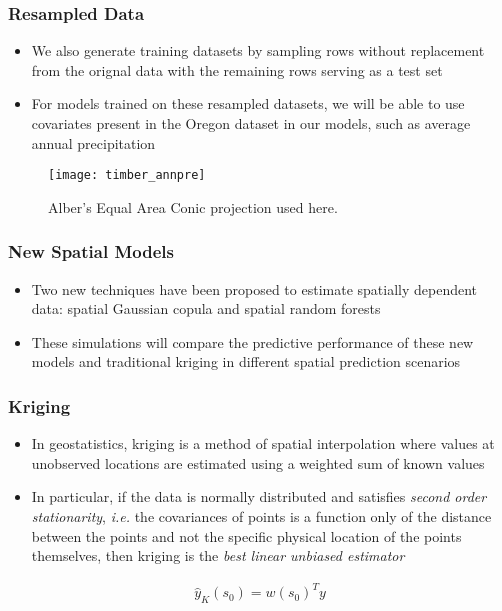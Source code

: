 \documentclass{beamer}
\begin{document}
\begin{frame}
	\frametitle{Resampled Data}
	\begin{itemize}
		\item We also generate training datasets by sampling rows without replacement from the orignal data with the remaining rows serving as a test set
		\item For models trained on these resampled datasets, we will be able to use covariates present in the Oregon dataset in our models, such as average annual precipitation
	\end{itemize}
	\begin{center}
		\begin{figure}[ht]
			\texttt{[image: timber\_annpre]}
			\caption{Alber's Equal Area Conic projection used here.}
		\end{figure}
	\end{center}
\end{frame}

\begin{frame}
	\frametitle{New Spatial Models}
	\begin{itemize}
		\item Two new techniques have been proposed to estimate spatially dependent data: spatial Gaussian copula and spatial random forests
		\item These simulations will compare the predictive performance of these new models and traditional kriging in different spatial prediction scenarios
	\end{itemize}
\end{frame}

\begin{frame}
	\frametitle{Kriging}
	\begin{itemize}
		\item In geostatistics, kriging is a method of spatial interpolation where values at unobserved locations are estimated using a weighted sum of known values
		\item In particular, if the data is normally distributed and satisfies \textit{second order stationarity}, \textit{i.e.} the covariances of points is a function only of the distance between the points and not the specific physical location of the points themselves, then kriging is the \textit{best linear unbiased estimator}\cite{cressie93}
	\end{itemize}
	\begin{align*}
		\hat{y}_{K}(s_0) = w(s_0)^T y
	\end{align*}
\end{frame}
\end{document}
